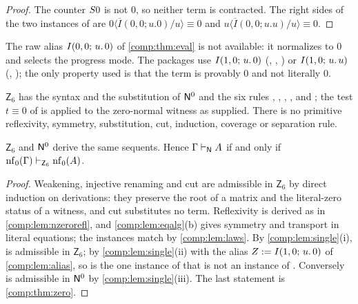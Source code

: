 \begin{proof}
The counter $S0$ is not $0$, so neither term is contracted. The right
sides of the two instances of  are
$0\langle\overline{I}(0,0;u.0)/u\rangle\equiv0$ and
$u\langle\overline{I}(0,0;u.u)/u\rangle\equiv0$.
\end{proof}

The raw alias $I(0,0;\,u.\,0)$ of \cref{comp:thm:eval} is not available: it
normalizes to $0$ and selects the progress mode. The packages use
$I(1,0;\,u.\,0)$ (, ,
) or $I(1,0;\,u.\,u)$ (,
); the only property used is that the term is provably
$0$ and not literally $0$.

\begin{definition}
\label{comp:def:zsix}
$\mathsf{Z}_6$ has the syntax and the substitution of $\mathsf{N}^{0}$ and the six
rules , , , ,
 and ; the test $t\equiv0$ of  is
applied to the zero-normal witness as supplied. There is no primitive
reflexivity, symmetry, substitution, cut, induction, coverage or separation
rule.
\end{definition}

\begin{theorem}
\label{comp:thm:zsix}
$\mathsf{Z}_6$ and $\mathsf{N}^{0}$ derive the same sequents. Hence
$\Gamma\vdash_{\mathsf{N}}A$ if and only if
$\operatorname{nf}_0(\Gamma)\vdash_{\mathsf{Z}_6}\operatorname{nf}_0(A)$.
\end{theorem}

\begin{proof}
Weakening, injective renaming and cut are admissible in $\mathsf{Z}_6$ by
direct induction on derivations: they preserve the root of a matrix and the
literal-zero status of a witness, and cut substitutes no term. Reflexivity
is derived as in \cref{comp:lem:nzerorefl}, and \cref{comp:lem:eqalg}(b)
gives symmetry and transport in literal equations; the instances match by
\cref{comp:lem:laws}. By \cref{comp:lem:single}(i),  is
admissible in $\mathsf{Z}_6$; by \cref{comp:lem:single}(ii) with the alias
$Z\mathrel{:=}I(1,0;\,u.\,0)$ of \cref{comp:lem:alias}, so is the one instance of
 that is not an instance of . Conversely
 is admissible in $\mathsf{N}^{0}$ by \cref{comp:lem:single}(iii).
The last statement is \cref{comp:thm:zero}.
\end{proof}

